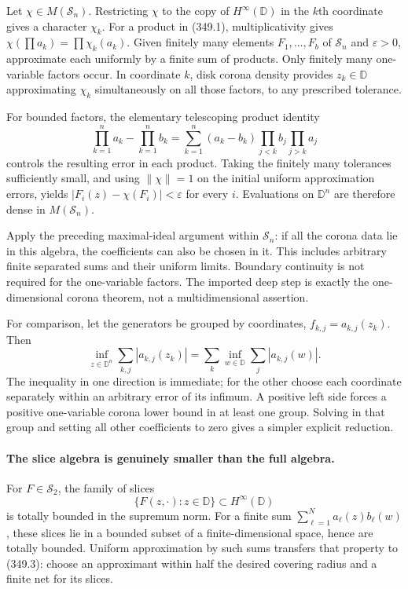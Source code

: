\documentclass[11pt]{article}
\begin{document}
Let $\chi\in M(\mathcal S_n)$. Restricting $\chi$ to the copy of
$H^\infty(\mathbb D)$ in the $k$th coordinate gives a character
$\chi_k$. For a product in (349.1), multiplicativity gives
$\chi(\prod a_k)=\prod\chi_k(a_k)$. Given finitely many elements
$F_1,\ldots,F_b$ of $\mathcal S_n$ and $\varepsilon>0$, approximate
each uniformly by a finite sum of products. Only finitely many
one-variable factors occur. In coordinate $k$, disk corona density
provides $z_k\in\mathbb D$ approximating $\chi_k$ simultaneously
on all those factors, to any prescribed tolerance.

For bounded factors, the elementary telescoping product identity
\[
 \prod_{k=1}^n a_k-\prod_{k=1}^n b_k
 =\sum_{k=1}^n(a_k-b_k)
       \prod_{j<k}b_j\prod_{j>k}a_j
 \tag{349.2}
\]
controls the resulting error in each product. Taking the finitely
many tolerances sufficiently small, and using $\|\chi\|=1$ on
the initial uniform approximation errors, yields
$|F_i(z)-\chi(F_i)|<\varepsilon$ for every $i$. Evaluations on
$\mathbb D^n$ are therefore dense in $M(\mathcal S_n)$.

Apply the preceding maximal-ideal argument within $\mathcal S_n$:
if all the corona data lie in this algebra, the coefficients can
also be chosen in it. This includes arbitrary finite separated sums
and their uniform limits. Boundary continuity is not required for
the one-variable factors. The imported deep step is exactly the
one-dimensional corona theorem, not a multidimensional assertion.

For comparison, let the generators be grouped by coordinates,
$f_{k,j}=a_{k,j}(z_k)$. Then
\[
 \inf_{z\in\mathbb D^n}\sum_{k,j}|a_{k,j}(z_k)|
 =\sum_k\inf_{w\in\mathbb D}\sum_j|a_{k,j}(w)|.
\]
The inequality in one direction is immediate; for the other choose
each coordinate separately within an arbitrary error of its infimum.
A positive left side forces a positive one-variable corona lower
bound in at least one group. Solving in that group and setting all
other coefficients to zero gives a simpler explicit reduction.

\paragraph{The slice algebra is genuinely smaller than the full algebra.}
For $F\in\mathcal S_2$, the family of slices
\[
 \{F(z,\cdot):z\in\mathbb D\}\subset H^\infty(\mathbb D)
 \tag{349.3}
\]
is totally bounded in the supremum norm. For a finite sum
$\sum_{\ell=1}^N a_\ell(z)b_\ell(w)$, these slices lie in a
bounded subset of a finite-dimensional space, hence are totally
bounded. Uniform approximation by such sums transfers that property
to (349.3): choose an approximant within half the desired covering
radius and a finite net for its slices.
\end{document}
